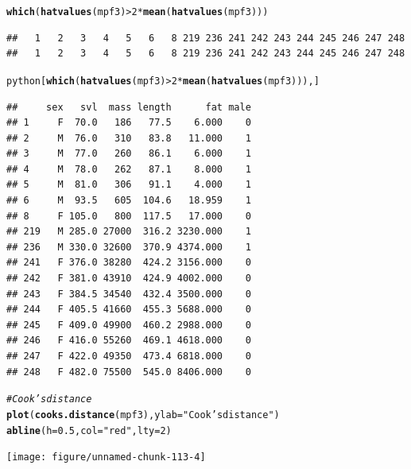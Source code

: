 \documentclass[oneside]{book}\usepackage[]{graphicx}\usepackage[dvipsnames,table,xcdraw]{xcolor}
\makeatletter
\newcommand{\hlnum}[1]{\textcolor[rgb]{0.686,0.059,0.569}{#1}}%
\newcommand{\hlstr}[1]{\textcolor[rgb]{0.192,0.494,0.8}{#1}}%
\newcommand{\hlcom}[1]{\textcolor[rgb]{0.678,0.584,0.686}{\textit{#1}}}%
\newcommand{\hlopt}[1]{\textcolor[rgb]{0,0,0}{#1}}%
\newcommand{\hlstd}[1]{\textcolor[rgb]{0.345,0.345,0.345}{#1}}%
\newcommand{\hlkwc}[1]{\textcolor[rgb]{0.333,0.667,0.333}{#1}}%
\newcommand{\hlkwd}[1]{\textcolor[rgb]{0.737,0.353,0.396}{\textbf{#1}}}%
\newenvironment{kframe}{%
 \def\at@end@of@kframe{}%
 \ifinner\ifhmode%
  \def\at@end@of@kframe{\end{minipage}}%
  \begin{minipage}{\columnwidth}%
 \fi\fi%
 \def\FrameCommand##1{\hskip\@totalleftmargin \hskip-\fboxsep
 \colorbox{shadecolor}{##1}\hskip-\fboxsep
     \hskip-\linewidth \hskip-\@totalleftmargin \hskip\columnwidth}%
 \MakeFramed {\advance\hsize-\width
   \@totalleftmargin\z@ \linewidth\hsize
   \@setminipage}}%
 {\par\unskip\endMakeFramed%
 \at@end@of@kframe}
\newenvironment{knitrout}{}{} %
\makeatother
\begin{document}
\begin{knitrout}
{}


\begin{kframe}\begin{alltt}
\hlkwd{which}\hlstd{(}\hlkwd{hatvalues}\hlstd{(mpf3)} \hlopt{>} \hlnum{2} \hlopt{*} \hlkwd{mean}\hlstd{(}\hlkwd{hatvalues}\hlstd{(mpf3)))}
\end{alltt}
\begin{verbatim}
##   1   2   3   4   5   6   8 219 236 241 242 243 244 245 246 247 248 
##   1   2   3   4   5   6   8 219 236 241 242 243 244 245 246 247 248
\end{verbatim}
\begin{alltt}
\hlstd{python[}\hlkwd{which}\hlstd{(}\hlkwd{hatvalues}\hlstd{(mpf3)} \hlopt{>} \hlnum{2} \hlopt{*} \hlkwd{mean}\hlstd{(}\hlkwd{hatvalues}\hlstd{(mpf3))), ]}
\end{alltt}
\begin{verbatim}
##     sex   svl  mass length      fat male
## 1     F  70.0   186   77.5    6.000    0
## 2     M  76.0   310   83.8   11.000    1
## 3     M  77.0   260   86.1    6.000    1
## 4     M  78.0   262   87.1    8.000    1
## 5     M  81.0   306   91.1    4.000    1
## 6     M  93.5   605  104.6   18.959    1
## 8     F 105.0   800  117.5   17.000    0
## 219   M 285.0 27000  316.2 3230.000    1
## 236   M 330.0 32600  370.9 4374.000    1
## 241   F 376.0 38280  424.2 3156.000    0
## 242   F 381.0 43910  424.9 4002.000    0
## 243   F 384.5 34540  432.4 3500.000    0
## 244   F 405.5 41660  455.3 5688.000    0
## 245   F 409.0 49900  460.2 2988.000    0
## 246   F 416.0 55260  469.1 4618.000    0
## 247   F 422.0 49350  473.4 6818.000    0
## 248   F 482.0 75500  545.0 8406.000    0
\end{verbatim}
\begin{alltt}
\hlcom{# Cook's distance}
\hlkwd{plot}\hlstd{(}\hlkwd{cooks.distance}\hlstd{(mpf3),} \hlkwc{ylab} \hlstd{=} \hlstr{"Cook's distance"}\hlstd{)}
\hlkwd{abline}\hlstd{(}\hlkwc{h} \hlstd{=} \hlnum{0.5}\hlstd{,} \hlkwc{col} \hlstd{=} \hlstr{"red"}\hlstd{,} \hlkwc{lty} \hlstd{=} \hlnum{2}\hlstd{)}
\end{alltt}
\end{kframe}

{\centering \texttt{[image: figure/unnamed-chunk-113-4]} 

}



\end{knitrout}
\end{document}
